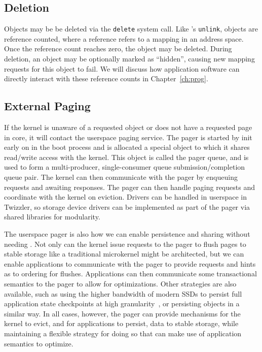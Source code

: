 \subsection{Deletion}

Objects may be be deleted via the \texttt{delete} system call.
Like \unix's \texttt{unlink}, objects are reference counted, where a reference refers to a mapping
in an address space. Once the reference count reaches zero, the object may be deleted. During
deletion, an object may be optionally marked as ``hidden'', causing new mapping requests for this
object to fail. We will discuss how application software can directly interact with these reference counts in Chapter~\ref{ch:prog}.

\subsection{External Paging}

If the kernel is unaware of a requested object or does not have a requested page in core, it will contact the userspace
paging service. The pager is started by init early on in the boot process and is allocated a special object to which it
shares read/write access with the kernel. This object is called the pager queue, and is used to form a multi-producer,
single-consumer queue submission/completion queue pair. The kernel can then communicate with the pager by enqueuing
requests and awaiting responses. The pager can then handle paging requests and coordinate with the kernel on eviction. Drivers can be
handled in userspace in Twizzler, so storage device drivers can be implemented as part of the pager via shared libraries
for modularity.

The userspace pager is also how we can enable persistence and sharing without needing \NVM. Not only can the kernel
issue requests to the pager to flush pages to stable storage like a traditional microkernel might be architected, but
we can enable applications to communicate with the pager to provide requests and hints as to ordering for flushes.
Applications can then communicate some transactional semantics to the pager to allow for optimizations. Other strategies
are also available, such as using the higher bandwidth of modern SSDs to persist full application state checkpoints at
high granularity~\cite{tsalapatis:sosp21}, or persisting objects in a similar way. In all cases, however, the pager can
provide mechanisms for the kernel to evict, and for applications to persist, data to stable storage, while maintaining a
flexible strategy for doing so that can make use of application semantics to optimize.

